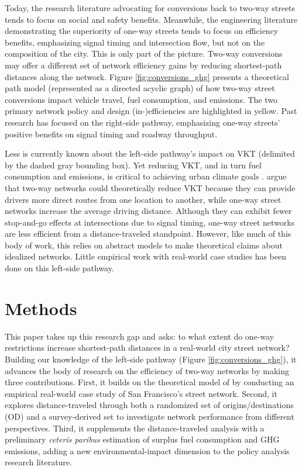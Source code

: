 \documentclass{trbunofficial}
\begin{document}
Today, the research literature advocating for conversions back to two-way streets tends to focus on social and safety benefits. Meanwhile, the engineering literature demonstrating the superiority of one-way streets tends to focus on efficiency benefits, emphasizing signal timing and intersection flow, but not on the composition of the city. This is only part of the picture. Two-way conversions may offer a different set of network efficiency gains by reducing shortest-path distances along the network. Figure \ref{fig:conversions_ghg} presents a theoretical path model (represented as a directed acyclic graph) of how two-way street conversions impact vehicle travel, fuel consumption, and emissions. The two primary network policy and design (in-)efficiencies are highlighted in yellow. Past research has focused on the right-side pathway, emphasizing one-way streets' positive benefits on signal timing and roadway throughput.

Less is currently known about the left-side pathway's impact on VKT (delimited by the dashed gray bounding box). Yet reducing VKT, and in turn fuel consumption and emissions, is critical to achieving urban climate goals \cite{barrington-leigh_more_2017}. \citet{ortigosa_analysis_2019} argue that two-way networks could theoretically reduce VKT because they can provide drivers more direct routes from one location to another, while one-way street networks increase the average driving distance. Although they can exhibit fewer stop-and-go effects at intersections due to signal timing, one-way street networks are less efficient from a distance-traveled standpoint. However, like much of this body of work, this relies on abstract models to make theoretical claims about idealized networks. Little empirical work with real-world case studies has been done on this left-side pathway. 

\section{Methods}

This paper takes up this research gap and asks: to what extent do one-way restrictions increase shortest-path distances in a real-world city street network? Building our knowledge of the left-side pathway (Figure \ref{fig:conversions_ghg}), it advances the body of research on the efficiency of two-way networks by making three contributions. First, it builds on the theoretical model of \citet{ortigosa_analysis_2019} by conducting an empirical real-world case study of San Francisco's street network. Second, it explores distance-traveled through both a randomized set of origins/destinations (OD) and a survey-derived set to investigate network performance from different perspectives. Third, it supplements the distance-traveled analysis with a preliminary \textit{ceteris paribus} estimation of surplus fuel consumption and GHG emissions, adding a new environmental-impact dimension to the policy analysis research literature.
\end{document}
